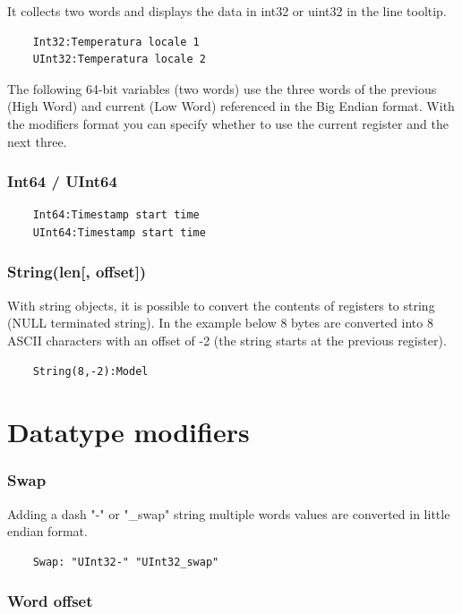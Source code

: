 It collects two words and displays the data in int32 or uint32 in the line tooltip.

\begin{verbatim}
    Int32:Temperatura locale 1
    UInt32:Temperatura locale 2
\end{verbatim}

The following 64-bit variables (two words) use the three words of the previous (High Word) and
current (Low Word) referenced in the Big Endian format. With the modifiers 
format you can specify whether to use the current register and the next three.
\subsubsection{Int64 / UInt64}

\begin{verbatim}
    Int64:Timestamp start time
    UInt64:Timestamp start time
\end{verbatim}

\subsubsection{String(len[, offset])}

With string objects, it is possible to convert the contents of registers
to string (NULL terminated string). In the example below
8 bytes are converted into 8 ASCII characters with an offset of -2
(the string starts at the previous register).

\begin{verbatim}
    String(8,-2):Model
\end{verbatim}

\section{Datatype modifiers}

\subsubsection{Swap}

Adding a dash "-" or "\_swap" string multiple words
values are converted in little endian format.

\begin{verbatim}
    Swap: "UInt32-" "UInt32_swap"
\end{verbatim}

\subsubsection{Word offset}

